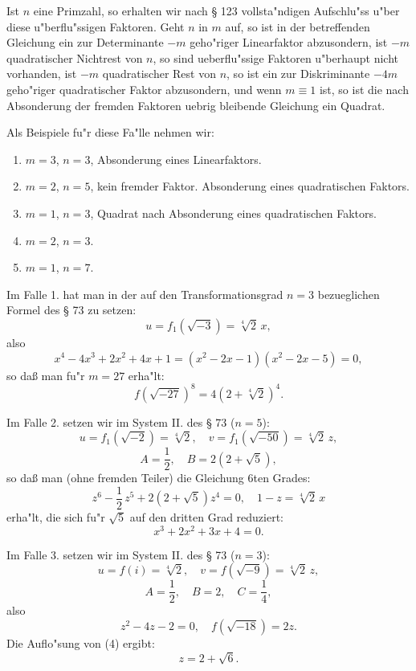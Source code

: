 \documentclass[12pt,a4paper]{article}
\theoremstyle{plain}
\theoremstyle{definition}
\theoremstyle{remark}
\begin{document}
Ist $n$ eine Primzahl, so erhalten wir nach \S{} 123 vollsta"ndigen Aufschlu"ss u"ber diese u"berflu"ssigen Faktoren. Geht $n$ in $m$ auf, so ist in der betreffenden Gleichung ein zur Determinante $-m$ geho"riger Linearfaktor abzusondern, ist $-m$ quadratischer Nichtrest von $n$, so sind ueberflu"ssige Faktoren u"berhaupt nicht vorhanden, ist $-m$ quadratischer Rest von $n$, so ist ein zur Diskriminante $-4m$ geho"riger quadratischer Faktor abzusondern, und wenn $m \equiv 1$ ist, so ist die nach Absonderung der fremden Faktoren uebrig bleibende Gleichung ein Quadrat.

Als Beispiele fu"r diese Fa"lle nehmen wir:
\begin{enumerate}
\item[1.] $m = 3$, $n = 3$, Absonderung eines Linearfaktors.
\item[2.] $m = 2$, $n = 5$, kein fremder Faktor. Absonderung eines quadratischen Faktors.
\item[3.] $m = 1$, $n = 3$, Quadrat nach Absonderung eines quadratischen Faktors.
\item[4.] $m = 2$, $n = 3$.
\item[5.] $m = 1$, $n = 7$.
\end{enumerate}

Im Falle 1. hat man in der auf den Transformationsgrad $n = 3$ bezueglichen Formel des \S{} 73 zu setzen:
\[
u = f_1(\sqrt{-3}) = \sqrt[4]{2}\, x,
\]
also
\[
x^4 - 4x^3 + 2x^2 + 4x + 1 = (x^2 - 2x - 1)(x^2 - 2x - 5) = 0,
\]
so da\ss{} man fu"r $m = 27$ erha"lt:
\begin{equation}\label{eq:130_1}
f(\sqrt{-27})^8 = 4(2 + \sqrt[4]{2})^4.
\end{equation}

Im Falle 2. setzen wir im System II. des \S{} 73 ($n = 5$):
\[
u = f_1(\sqrt{-2}) = \sqrt[4]{2}, \quad v = f_1(\sqrt{-50}) = \sqrt[4]{2}\, z,
\]
\[
A = \frac{1}{2}, \quad B = 2(2 + \sqrt{5}),
\]
so da\ss{} man (ohne fremden Teiler) die Gleichung 6ten Grades:
\[
z^6 - \frac{1}{2}\, z^5 + 2(2 + \sqrt{5})z^4 = 0, \quad 1 - z = \sqrt[4]{2}\, x
\]
erha"lt, die sich fu"r $\sqrt{5}$ auf den dritten Grad reduziert:
\begin{equation}\label{eq:130_3}
x^3 + 2x^2 + 3x + 4 = 0.
\end{equation}

Im Falle 3. setzen wir im System II. des \S{} 73 ($n = 3$):
\[
u = f(i) = \sqrt[4]{2}, \quad v = f(\sqrt{-9}) = \sqrt[4]{2}\, z,
\]
\[
A = \frac{1}{2}, \quad B = 2, \quad C = \frac{1}{4},
\]
also
\begin{equation}\label{eq:130_4}
z^2 - 4z - 2 = 0, \quad f(\sqrt{-18}) = 2z.
\end{equation}
Die Auflo"sung von (4) ergibt:
\begin{equation}\label{eq:130_5}
z = 2 + \sqrt{6}.
\end{equation}
\end{document}
